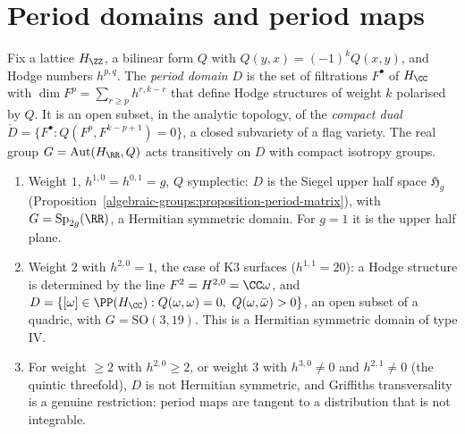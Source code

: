 \section{Period domains and period maps}\label{vhs:section-period-domains}

\begin{definition}\label{vhs:definition-period-domain}
Fix a lattice $H_\ZZ$, a bilinear form $Q$ with $Q(y, x) = (-1)^kQ(x, y)$, and Hodge numbers $h^{p,q}$. The \emph{period domain} $D$ is the set of filtrations $F^\bullet$ of $H_\CC$ with
$\dim F^p = \sum_{r \geq p}h^{r,k-r}$ that define Hodge structures of weight $k$ polarised by $Q$. It is an open subset, in the analytic topology, of the \emph{compact dual}
$\check D = \{F^\bullet : Q(F^p, F^{k-p+1}) = 0\}$, a closed subvariety of a flag variety. The real group $G = \mathrm{Aut}(H_\RR, Q)$ acts transitively on $D$ with compact isotropy groups.
\end{definition}

\begin{example}\label{vhs:example-period-domains}
\begin{enumerate}
\item Weight $1$, $h^{1,0} = h^{0,1} = g$, $Q$ symplectic: $D$ is the Siegel upper half space $\mathfrak{H}_g$ (Proposition~\ref{algebraic-groups:proposition-period-matrix}), with
$G = \mathrm{Sp}_{2g}(\RR)$, a Hermitian symmetric domain. For $g = 1$ it is the upper half plane.
\item Weight $2$ with $h^{2,0} = 1$, the case of K3 surfaces ($h^{1,1} = 20$): a Hodge structure is determined by the line $F^2 = H^{2,0} = \CC\omega$, and $D = \{[\omega] \in \PP(H_\CC) : Q(\omega, \omega) = 0,\ Q(\omega, \bar\omega) > 0\}$,
an open subset of a quadric, with $G = \mathrm{SO}(3, 19)$. This is a Hermitian symmetric domain of type IV.
\item For weight $\geq 2$ with $h^{2,0} \geq 2$, or weight $3$ with $h^{3,0} \neq 0$ and $h^{2,1} \neq 0$ (the quintic threefold), $D$ is not Hermitian symmetric, and Griffiths transversality is a
genuine restriction: period maps are tangent to a distribution that is not integrable.
\end{enumerate}
\end{example}

